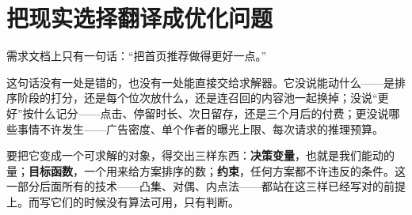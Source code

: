 \section{把现实选择翻译成优化问题}
\label{sec:09-Convex-Optimization/01-Optimization-Foundations/01}

需求文档上只有一句话：``把首页推荐做得更好一点。''

这句话没有一处是错的，也没有一处能直接交给求解器。它没说能动什么——是排序阶段的打分，还是每个位次放什么，还是连召回的内容池一起换掉；没说``更好''按什么记分——点击、停留时长、次日留存，还是三个月后的付费；更没说哪些事情不许发生——广告密度、单个作者的曝光上限、每次请求的推理预算。

要把它变成一个可求解的对象，得交出三样东西：\textbf{决策变量}，也就是我们能动的量；\textbf{目标函数}，一个用来给方案排序的数；\textbf{约束}，任何方案都不许违反的条件。这一部分后面所有的技术——凸集、对偶、内点法——都站在这三样已经写对的前提上。而写它们的时候没有算法可用，只有判断。

